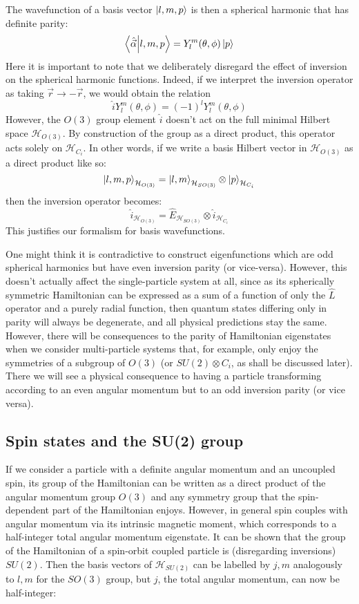 \documentclass[12pt]{article}
\begin{document}
	The wavefunction of a basis vector $\ket{l,m,p}$ is then a spherical harmonic that has definite parity:
	$$\braket{\hat{\vec{\alpha}}}{l,m,p}=Y_l^m(\theta,\phi)\ket{p}$$
	Here it is important to note that we deliberately disregard the effect of inversion on the spherical harmonic functions. Indeed, if we interpret the inversion operator as taking $\vec{r}\to-\vec{r}$, we would obtain the relation
	$$\hat{i}Y_l^m(\theta,\phi)=(-1)^lY_l^m(\theta,\phi)$$
	However, the $O(3)$ group element $\hat{i}$ doesn't act on the full minimal Hilbert space $\mathcal{H}_{O(3)}$. By construction of the group as a direct product, this operator acts solely on $\mathcal{H}_{C_i}$. In other words, if we write a basis Hilbert vector in $\mathcal{H}_{O(3)}$ as a direct product like so:
	$$\ket{l,m,p}_{\mathcal{H}_{O(3)}}=\ket{l,m}_{\mathcal{H}_{SO(3)}}\otimes \ket{p}_{\mathcal{H}_{C_i}}$$
	then the inversion operator becomes:
	$$\hat{i}_{\mathcal{H}_{O(3)}}=\hat{E}_{\mathcal{H}_{SO(3)}}\otimes \hat{i}_{\mathcal{H}_{C_i}}$$
	This justifies our formalism for basis wavefunctions.
	
	One might think it is contradictive to construct eigenfunctions which are odd spherical harmonics but have even inversion parity (or vice-versa). However, this doesn't actually affect the single-particle system at all, since as its spherically symmetric Hamiltonian can be expressed as a sum of a function of only the $\hat{L}$ operator and a purely radial function, then quantum states differing only in parity will always be degenerate, and all physical predictions stay the same. However, there will be consequences to the parity of Hamiltonian eigenstates when we consider multi-particle systems that, for example, only enjoy the symmetries of a subgroup of $O(3)$ (or $SU(2)\otimes C_i$, as shall be discussed later). There we will see a physical consequence to having a particle transforming according to an even angular momentum but to an odd inversion parity (or vice versa).
	
	\subsection{Spin states and the SU(2) group}
	
	If we consider a particle with a definite angular momentum and an uncoupled spin, its group of the Hamiltonian can be written as a direct product of the angular momentum group $O(3)$ and any symmetry group that the spin-dependent part of the Hamiltonian enjoys. However, in general spin couples with angular momentum via its intrinsic magnetic moment, which corresponds to a half-integer total angular momentum eigenstate. It can be shown that the group of the Hamiltonian of a spin-orbit coupled particle is (disregarding inversions) $SU(2)$. Then the basis vectors of $\mathcal{H}_{SU(2)}$ can be labelled by $j,m$ analogously to $l,m$ for the $SO(3)$ group, but $j$, the total angular momentum, can now be half-integer:
	
\end{document}
